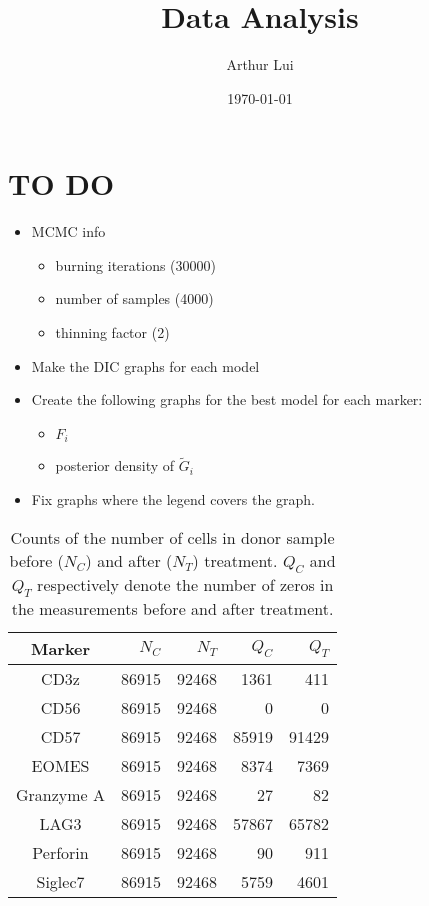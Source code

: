 \documentclass[12pt]{article} %
\title{Data Analysis}
\author{Arthur Lui}
\date{\today} %
\begin{document}
\maketitle

\section{TO DO}
\begin{itemize}
  \item MCMC info
  \begin{itemize}
    \item burning iterations (30000)
    \item number of samples (4000)
    \item thinning factor (2)
  \end{itemize}
  \item Make the DIC graphs for each model
  \item Create the following graphs for the best model for each marker:
  \begin{itemize}
    \item $F_i$
    \item posterior density of $\tilde G_i$
  \end{itemize}
  \item Fix graphs where the legend covers the graph. 
\end{itemize}

\begin{table}[!t]
  \centering
  \begin{tabular}{|c|rrrr|}
    \hline
    Marker & $N_C$ & $N_T$ & $Q_C$ & $Q_T$ \\ 
    \hline
    CD3z       & 86915 & 92468 &  1361 &   411 \\ 
    CD56       & 86915 & 92468 &     0 &     0 \\ 
    CD57       & 86915 & 92468 & 85919 & 91429 \\ 
    EOMES      & 86915 & 92468 &  8374 &  7369 \\ 
    Granzyme A & 86915 & 92468 &    27 &    82 \\ 
    LAG3       & 86915 & 92468 & 57867 & 65782 \\ 
    Perforin   & 86915 & 92468 &    90 &   911 \\ 
    Siglec7    & 86915 & 92468 &  5759 &  4601 \\
    \hline
  \end{tabular} 
  \caption{Counts of the number of cells in donor sample before ($N_C$) and
  after ($N_T$) treatment. $Q_C$ and $Q_T$ respectively denote the number
  of zeros in the measurements before and after treatment.}
  \label{tab:data-counts}
\end{table}
\end{document}
